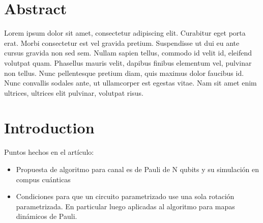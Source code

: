 \documentclass[10pt,letterpaper]{article} %
\begin{document}
\section*{Abstract}
Lorem ipsum dolor sit amet, consectetur adipiscing elit. Curabitur eget porta erat. Morbi consectetur est vel gravida pretium. Suspendisse ut dui eu ante cursus gravida non sed sem. Nullam sapien tellus, commodo id velit id, eleifend volutpat quam. Phasellus mauris velit, dapibus finibus elementum vel, pulvinar non tellus. Nunc pellentesque pretium diam, quis maximus dolor faucibus id. Nunc convallis sodales ante, ut ullamcorper est egestas vitae. Nam sit amet enim ultrices, ultrices elit pulvinar, volutpat risus.



\linenumbers

\section{Introduction} %


Puntos hechos en el artículo:
\begin{itemize}
\item Propuesta de algoritmo para canal es de Pauli de N qubits y su simulación en compus cuánticas
\item Condiciones para que un circuito parametrizado use una sola rotación parametrizada. En particular luego aplicadas al algoritmo para mapas dinámicos de Pauli.
\end{itemize}

\\
\end{document}

